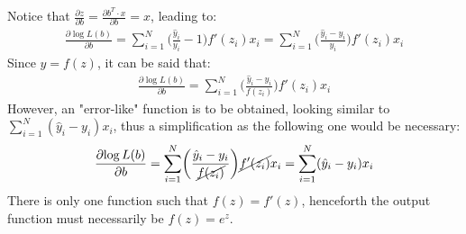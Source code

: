 Notice that
\(\frac{\partial{z}}{\partial{b}}=\frac{\partial{b^T\cdot x}}{\partial{b}}=x\),
leading to:
\begin{align*}
    \frac{\partial{\log{L(b)}}}{\partial{b}}
    =\sum_{i=1}^{N}\biggl(\frac{\hat{y}_i}{y_i}-1\biggr)f'(z_i)x_i
    =\sum_{i=1}^{N}\biggl(\frac{\hat{y}_i-y_i}{y_i}\biggr)f'(z_i)x_i
\end{align*}
Since \(y=f(z)\), it can be said that:
\begin{align*}
    \frac{\partial{\log{L(b)}}}{\partial{b}}
    =\sum_{i=1}^{N}\biggl(\frac{\hat{y}_i-y_i}{f(z_i)}\biggr)f'(z_i)x_i
\end{align*}
However, an "error-like" function is to be obtained, looking similar to
\(\sum_{i=1}^{N}(\hat{y}_i-y_i)x_i\), thus a simplification as the following
one would be necessary:
\begin{align*}
    \frac{\partial{\log{L(b)}}}{\partial{b}}
    =\sum_{i=1}^{N}\biggl(\frac{\hat{y}_i-y_i}{\cancel{f(z_i)}}\biggr)\cancel{f'(z_i)}x_i
    =\sum_{i=1}^{N}(\hat{y}_i-y_i)x_i
\end{align*}
There is only one function such that \(f(z)=f'(z)\), henceforth the output
function must necessarily be \(f(z)=e^z\).
